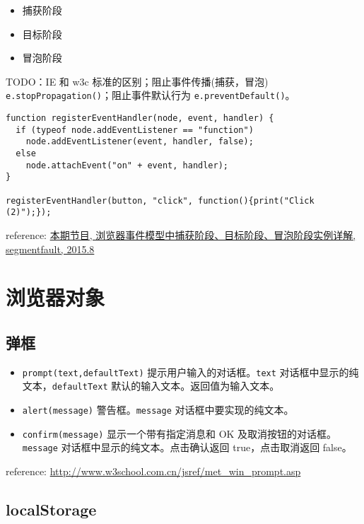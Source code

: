 \begin{itemize}
\item 捕获阶段
\item 目标阶段
\item 冒泡阶段
\end{itemize}

TODO：IE 和 w3c 标准的区别；阻止事件传播(捕获，冒泡) \texttt{e.stopPropagation()}；阻止事件默认行为 \texttt{e.preventDefault()}。

\begin{verbatim}function registerEventHandler(node, event, handler) {
  if (typeof node.addEventListener == "function")
    node.addEventListener(event, handler, false);
  else
    node.attachEvent("on" + event, handler);
}

registerEventHandler(button, "click", function(){print("Click (2)");});
\end{verbatim}

reference: \href{http://segmentfault.com/a/1190000003482372}{本期节目, 浏览器事件模型中捕获阶段、目标阶段、冒泡阶段实例详解, segmentfault, 2015.8}

\section{浏览器对象}\hypertarget{section-10}{}\label{section-10}

\subsection{弹框}\hypertarget{section-11}{}\label{section-11}

\begin{itemize}
\item \texttt{prompt(text,defaultText)} 提示用户输入的对话框。\texttt{text} 对话框中显示的纯文本，\texttt{defaultText} 默认的输入文本。返回值为输入文本。
\item \texttt{alert(message)} 警告框。\texttt{message} 对话框中要实现的纯文本。
\item \texttt{confirm(message)} 显示一个带有指定消息和 OK 及取消按钮的对话框。\texttt{message} 对话框中显示的纯文本。点击确认返回 true，点击取消返回 false。
\end{itemize}

reference: \href{http://www.w3school.com.cn/jsref/met\_win\_prompt.asp}{http://www.w3school.com.cn/jsref/met\_win\_prompt.asp}

\subsection{localStorage}\hypertarget{localstorage}{}\label{localstorage}

